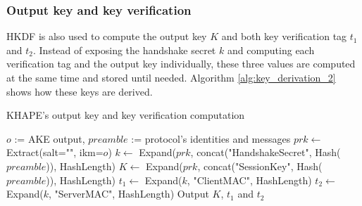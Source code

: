 ﻿\documentclass[../report.tex]{subfiles}
\begin{document}
% 
% 

\subsubsection{Output key and key verification}
HKDF is also used to compute the output key $K$ and both key verification tag $t_1$ and $t_2$.
Instead of exposing the handshake secret $k$ and computing each verification tag and the output key individually, these three values are computed at the same time and stored until needed.
Algorithm \ref{alg:key_derivation_2} shows how these keys are derived.
\begin{algorithm}
\caption{KHAPE's output key and key verification computation}
\label{alg:key_derivation_2}
\begin{algorithmic}
\Require $o$ := AKE output, $preamble$ := protocol's identities and messages
\State $prk \gets$ Extract(salt="", ikm=$o$)
\State $k \gets$ Expand($prk$, concat("HandshakeSecret", Hash($preamble$)), HashLength)
\State $K \gets$ Expand($prk$, concat("SessionKey", Hash($preamble$)), HashLength)
\State $t_1 \gets$ Expand($k$, "ClientMAC", HashLength)
\State $t_2 \gets$ Expand($k$, "ServerMAC", HashLength)
\State Output $K$, $t_1$ and $t_2$
\end{algorithmic}
\end{algorithm}
% 
% 
% 
\end{document}
